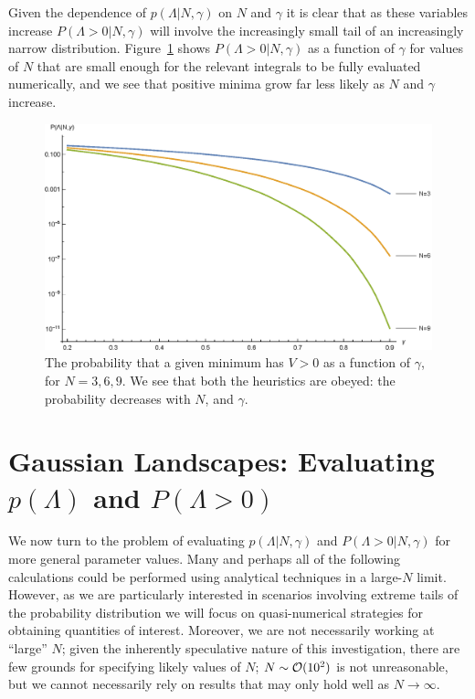 \documentclass[12pt]{article}
\begin{document}
Given the dependence of $p(\Lambda|N,\gamma)$ on $N$ and $\gamma$ it is clear that as these variables increase $P(\Lambda>0|N,\gamma)$ will involve the increasingly small tail of an increasingly narrow distribution. Figure~\ref{N6} shows $P(\Lambda>0|N,\gamma)$ as a function of $\gamma$ for values of $N$ that are small enough for the relevant integrals to be fully evaluated numerically, and we see that positive minima grow far less likely as $N$ and $\gamma$ increase. 

\begin{figure}
  \centering
  \includegraphics[width=.8 \linewidth]{N369.eps}
  \caption{The probability that a given minimum has $V > 0$ as a function of $\gamma$, for $N=3, 6, 9$. We see that both the heuristics are obeyed: the probability decreases with $N$, and  $\gamma$.}
  \label{N6}
  \end{figure}


\section{Gaussian Landscapes: Evaluating $p(\Lambda)$ and $P(\Lambda>0)$} \label{PeakNumbers}

We now turn to the problem of evaluating $p(\Lambda|N,\gamma)$ and $P(\Lambda>0|N,\gamma)$  for more general parameter values. Many and perhaps all of the following calculations could be performed using analytical techniques in a large-$N$ limit. However,  as we are particularly interested in scenarios involving extreme tails of  the probability distribution we will focus on quasi-numerical strategies for obtaining quantities of interest. Moreover, we are  not necessarily working at ``large'' $N$; given the inherently speculative nature of this investigation, there are few  grounds for specifying likely values of $N$;  $N\sim{\cal O}(10^2)$ is not unreasonable, but we cannot necessarily rely on results that may only hold well as $N\rightarrow \infty$. 
\end{document}
